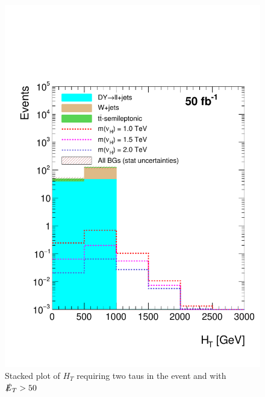 \begin{figure}[htbp!]
\centering
\includegraphics[width=0.9\linewidth]{StackPlots/HT_2taus_met50_50ifb.pdf}
\caption{Stacked plot of $H_{T}$ requiring two taus in the event and with $\slashed{E}_{T} > 50$}
\label{fig: HT2tausMet50}
\end{figure}

